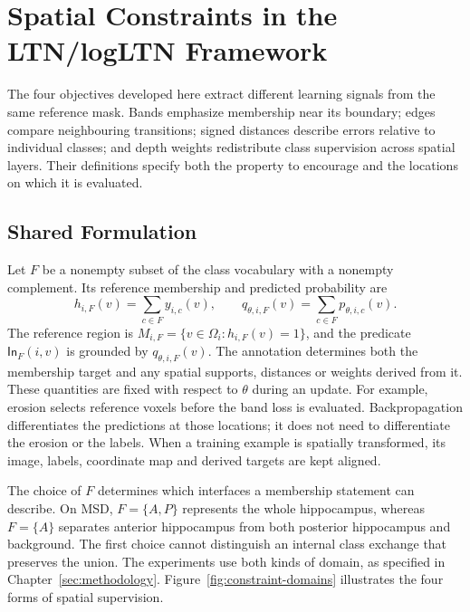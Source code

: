 \documentclass[12pt,a4paper]{article}
\begin{document}
\clearpage
\section{Spatial Constraints in the LTN/logLTN Framework}
\label{sec:spatial-constraints}

The four objectives developed here extract different learning signals from
the same reference mask. Bands emphasize membership near its boundary;
edges compare neighbouring transitions; signed distances describe errors
relative to individual classes; and depth weights redistribute class
supervision across spatial layers. Their definitions specify both
the property to encourage and the locations on which it is evaluated.

\subsection{Shared Formulation}\label{sec:constraint-formulation}

Let $F$ be a nonempty subset of the class vocabulary with a nonempty
complement. Its reference membership and predicted probability are
\begin{equation}
h_{i,F}(v)=\sum_{c\in F}y_{i,c}(v),
\qquad
q_{\theta,i,F}(v)=\sum_{c\in F}p_{\theta,i,c}(v).
\label{eq:constraint-group-membership}
\end{equation}
The reference region is $M_{i,F}=\{v\in\Omega_i:h_{i,F}(v)=1\}$,
and the predicate $\mathsf{In}_F(i,v)$ is grounded by
$q_{\theta,i,F}(v)$. The annotation determines both the membership
target and any spatial supports, distances or weights derived from it.
These quantities are fixed with respect to $\theta$ during an update.
For example, erosion selects reference voxels before the band loss is
evaluated. Backpropagation differentiates the predictions at those
locations; it does not need to differentiate the erosion or the labels.
When a training example is spatially transformed, its image, labels,
coordinate map and derived targets are kept aligned.

The choice of $F$ determines which interfaces a membership statement
can describe. On MSD, $F=\{A,P\}$ represents the whole hippocampus,
whereas $F=\{A\}$ separates anterior hippocampus from both posterior
hippocampus and background. The first choice cannot distinguish an
internal class exchange that preserves the union. The experiments use
both kinds of domain, as specified in Chapter~\ref{sec:methodology}.
Figure~\ref{fig:constraint-domains} illustrates the four forms of
spatial supervision.
\end{document}
